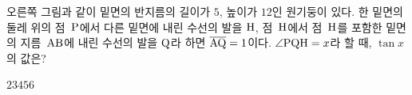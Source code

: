 \noindent\begin{minipage}[t]{0.58\linewidth}\vspace{0pt}\raggedright 오른쪽 그림과 같이 밑면의 반지름의 길이가 $5$, 높이가 $12$인 원기둥이 있다. 한 밑면의 둘레 위의 점~$\mathrm{P}$에서 다른 밑면에 내린 수선의 발을 $\mathrm{H}$, 점~$\mathrm{H}$에서 점~$\mathrm{H}$를 포함한 밑면의 지름~$\mathrm{AB}$에 내린 수선의 발을 $\mathrm{Q}$라 하면 $\overline{\mathrm{AQ}}=1$이다. $\angle\mathrm{PQH}=x$라 할 때, $\tan x$의 값은?\end{minipage}\hfill\begin{minipage}[t]{0.4\linewidth}\vspace{0pt}\centering \resizebox{\ifdim\width>\linewidth\linewidth\else\width\fi}{!}{}\end{minipage}\par
\begin{choices32}{$2$}{$3$}{$4$}{$5$}{$6$}\end{choices32}
